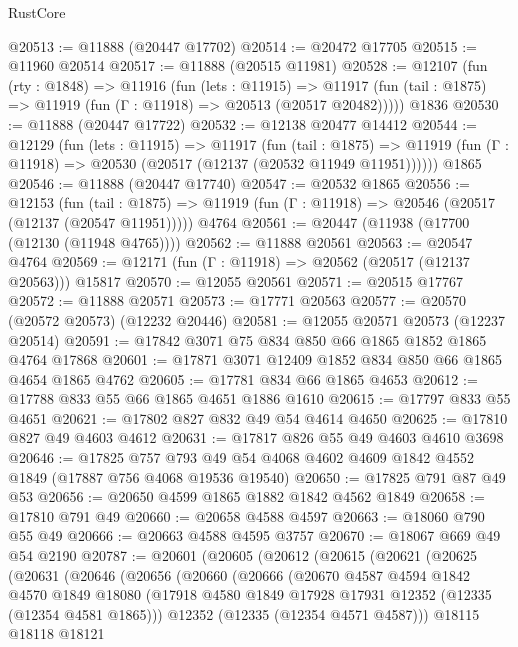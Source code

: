 \begin{lexlean}{RustCore}
\begin{coremodule}
@20513 := @11888 (@20447 @17702)
@20514 := @20472 @17705
@20515 := @11960 @20514
@20517 := @11888 (@20515 @11981)
@20528 := @12107
    (fun (rty : @1848) =>
    @11916
      (fun (lets : @11915) =>
      @11917 (fun (tail : @1875) => @11919 (fun (Γ : @11918) => @20513 (@20517 @20482)))))
    @1836
@20530 := @11888 (@20447 @17722)
@20532 := @12138 @20477 @14412
@20544 := @12129
    (fun (lets : @11915) =>
    @11917
      (fun (tail : @1875) =>
      @11919 (fun (Γ : @11918) => @20530 (@20517 (@12137 (@20532 @11949 @11951))))))
    @1865
@20546 := @11888 (@20447 @17740)
@20547 := @20532 @1865
@20556 := @12153
    (fun (tail : @1875) => @11919 (fun (Γ : @11918) => @20546 (@20517 (@12137 (@20547 @11951)))))
    @4764
@20561 := @20447 (@11938 (@17700 (@12130 (@11948 @4765))))
@20562 := @11888 @20561
@20563 := @20547 @4764
@20569 := @12171 (fun (Γ : @11918) => @20562 (@20517 (@12137 @20563))) @15817
@20570 := @12055 @20561
@20571 := @20515 @17767
@20572 := @11888 @20571
@20573 := @17771 @20563
@20577 := @20570 (@20572 @20573) (@12232 @20446)
@20581 := @12055 @20571 @20573 (@12237 @20514)
@20591 := @17842 @3071 @75 @834 @850 @66 @1865 @1852 @1865 @4764 @17868
@20601 := @17871 @3071 @12409 @1852 @834 @850 @66 @1865 @4654 @1865 @4762
@20605 := @17781 @834 @66 @1865 @4653
@20612 := @17788 @833 @55 @66 @1865 @4651 @1886 @1610
@20615 := @17797 @833 @55 @4651
@20621 := @17802 @827 @832 @49 @54 @4614 @4650
@20625 := @17810 @827 @49 @4603 @4612
@20631 := @17817 @826 @55 @49 @4603 @4610 @3698
@20646 := @17825
    @757
    @793
    @49
    @54
    @4068
    @4602
    @4609
    @1842
    @4552
    @1849
    (@17887 @756 @4068 @19536 @19540)
@20650 := @17825 @791 @87 @49 @53
@20656 := @20650 @4599 @1865 @1882 @1842 @4562 @1849
@20658 := @17810 @791 @49
@20660 := @20658 @4588 @4597
@20663 := @18060 @790 @55 @49
@20666 := @20663 @4588 @4595 @3757
@20670 := @18067 @669 @49 @54 @2190
@20787 := @20601
    (@20605
      (@20612
        (@20615
          (@20621
            (@20625
              (@20631
                (@20646
                  (@20656
                    (@20660
                      (@20666
                        (@20670
                          @4587
                          @4594
                          @1842
                          @4570
                          @1849
                          @18080
                          (@17918 @4580 @1849 @17928 @17931 @12352 (@12335 (@12354 @4581 @1865)))
                          @12352
                          (@12335 (@12354 @4571 @4587)))
                        @18115
                        @18118
                        @18121

\end{coremodule}
\end{lexlean}
